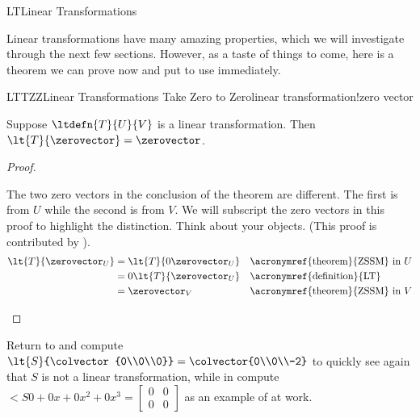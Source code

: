 \begin{subsect}{LT}{Linear Transformations}
%
\begin{para}Linear transformations have many amazing properties, which we will investigate through the next few sections.  However, as a taste of things to come, here is a theorem we can prove now and put to use immediately.\end{para}
%
\begin{theorem}{LTTZZ}{Linear Transformations Take Zero to Zero}{linear transformation!zero vector}
\begin{para}Suppose $\ltdefn{T}{U}{V}$ is a linear transformation.  Then $\lt{T}{\zerovector}=\zerovector$.\end{para}
\end{theorem}
%
\begin{proof}
\begin{para}The two zero vectors in the conclusion of the theorem are different.  The first is from $U$ while the second is from $V$.  We will subscript the zero vectors in this proof to highlight the distinction.  Think about your objects.  (This proof is contributed by \markshoemaker).
%
\begin{align*}
\lt{T}{\zerovector_U}
&=\lt{T}{0\zerovector_U}
&&\text{\acronymref{theorem}{ZSSM} in $U$}\\
%
&=0\lt{T}{\zerovector_U}
&&\text{\acronymref{definition}{LT}}\\
%
&=\zerovector_V
&&\text{\acronymref{theorem}{ZSSM} in $V$}
%
\end{align*}
\end{para}
%
\end{proof}
%
\begin{para}Return to  and compute $\lt{S}{\colvector{0\\0\\0}}=\colvector{0\\0\\-2}$ to quickly see again that $S$ is not a linear transformation, while in   compute
$\lt{S}{0+0x+0x^2+0x^3}=\begin{bmatrix}0&0\\0&0\end{bmatrix}$
as an example of  at work.\end{para}
%
%
\end{subsect}
%
